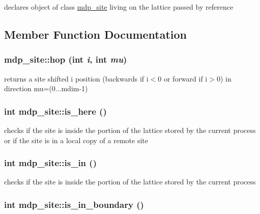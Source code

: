 declares object of class \hyperlink{classmdp__site}{mdp\_\-site} living on the lattice passed by reference 

\subsection{Member Function Documentation}
\hypertarget{classmdp__site_5982cae4c0bf2c255a978529dc6afe6c}{
\subsubsection[{hop}]{ mdp\_\-site::hop (int {\em i}, \/  int {\em mu})}}
\label{classmdp__site_5982cae4c0bf2c255a978529dc6afe6c}


returns a site shifted i position (backwards if i$<$0 or forward if i$>$0) in direction mu=(0...mdim-1) \hypertarget{classmdp__site_1457471b74c722514712f1efb1093f63}{
\subsubsection[{is\_\-here}]{\setlength{\rightskip}{0pt plus 5cm}int mdp\_\-site::is\_\-here ()}}
\label{classmdp__site_1457471b74c722514712f1efb1093f63}


checks if the site is inside the portion of the lattice stored by the current process or if the site is in a local copy of a remote site \hypertarget{classmdp__site_57ff5d47780a90ad36c9368360ad2d89}{
\subsubsection[{is\_\-in}]{\setlength{\rightskip}{0pt plus 5cm}int mdp\_\-site::is\_\-in ()}}
\label{classmdp__site_57ff5d47780a90ad36c9368360ad2d89}


checks if the site is inside the portion of the lattice stored by the current process \hypertarget{classmdp__site_57188578cccbd53d6ff5ef5b791d32a4}{
\subsubsection[{is\_\-in\_\-boundary}]{\setlength{\rightskip}{0pt plus 5cm}int mdp\_\-site::is\_\-in\_\-boundary ()}}
\label{classmdp__site_57188578cccbd53d6ff5ef5b791d32a4}


